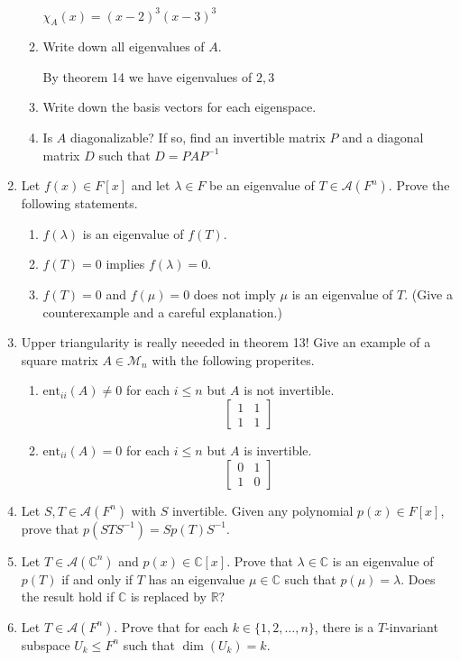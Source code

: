 \documentclass[letterpaper]{article}
\begin{document}
\begin{enumerate}
\begin{enumerate}
  $\chi_A(x)=(x-2)^3(x-3)^3$
  \item
  Write down all eigenvalues of $A$.

  By theorem 14 we have eigenvalues of $2,3$
  \item
  Write down the basis vectors for each eigenspace.
  \item
  Is $A$ diagonalizable? If so, find an invertible matrix $P$ and a diagonal matrix $D$ such that $D=PAP^{-1}$
  \end{enumerate}
\item
Let $f(x)\in F[x]$ and let $\lambda\in F$ be an eigenvalue of $T\in \mathcal{A}(F^n)$. Prove the following statements.
  \begin{enumerate}
  \item
  $f(\lambda)$ is an eigenvalue of $f(T)$.
  \item
  $f(T)=0$ implies $f(\lambda)=0$.
  \item
  $f(T)=0$ and $f(\mu)=0$ does not imply $\mu$ is an eigenvalue of $T$. (Give a counterexample and a careful explanation.)
  \end{enumerate}
\item
Upper triangularity is really neeeded in theorem 13! Give an example of a square matrix $A\in \mathcal{M}_n$ with the following properites.
  \begin{enumerate}
  \item
  $\text{ent}_{ii}(A)\ne0$ for each $i\le n$ but $A$ is not invertible.
  \[\left[\begin{array}{cc}1&1\\1&1\end{array}\right]\]
  \item
  $\text{ent}_{ii}(A)=0$ for each $i\le n$ but $A$ is invertible.
  \[\left[\begin{array}{cc}0&1\\1&0\end{array}\right]\]
  \end{enumerate}
\item
Let $S,T\in \mathcal{A}(F^n)$ with $S$ invertible. Given any polynomial $p(x)\in F[x]$, prove that $p(STS^{-1})=Sp(T)S^{-1}$.
\item
Let $T\in \mathcal{A}(\mathbb{C}^n)$ and $p(x)\in \mathbb{C}[x]$. Prove that $\lambda\in \mathbb{C}$ is an eigenvalue of $p(T)$ if and only if $T$ has an eigenvalue $\mu\in \mathbb{C}$ such that $p(\mu)=\lambda$. Does the result hold if $\mathbb{C}$ is replaced by $\mathbb{R}$?
\item
Let $T\in \mathcal{A}(F^n)$. Prove that for each $k\in \{1,2,\dots,n\}$, there is a $T$-invariant subspace $U_k\le F^n$ such that $\dim(U_k)=k$.
\end{enumerate}
\end{document}
